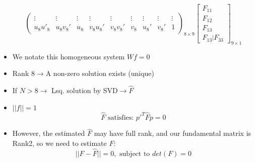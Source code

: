 \begin{itemize}
$$\begin{pmatrix}
		\vdots & \vdots & \vdots & \vdots & \vdots & \vdots & \vdots & \vdots & \vdots \\
		u_8u'_8 & u_8 v_8' & u_8 & v_8 u_8' & v_8 v_8' & v_8 & u_8' & v_8' & 1 
	\end{pmatrix}_{8\times 9}\begin{bmatrix}
		F_{11} \\ F_{12} \\ F_{13} \\ F_{13} \vdots F_{33}
	\end{bmatrix}_{9\times 1}$$
	\item We notate this homogeneous system $Wf=0$
	\item Rank $8\to$A non-zero solution exists (unique)
	\item If $N>8\to$ Lsq. solution by SVD$\to\hat{F}$
	\item $||f||=1$
		$$\hat{F}\text{ satisfies: }p'^T \hat{F}p=0$$
	\item However, the estimated $\hat{F}$ may have full rank, and our fundamental matrix is Rank2, so we need to estimate $F$:
		$$||F-\hat{F}||=0,\text{ subject to }det(F)=0$$
\end{itemize}

